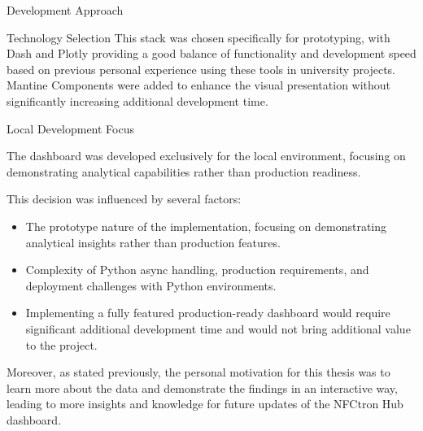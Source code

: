 \begin{section}{Development Approach}
\begin{subsection}{Technology Selection}
		This stack was chosen specifically for prototyping, with Dash and Plotly providing a good balance of functionality
		and development speed\cite{plotly_dash_plotly_com} based on previous personal experience using these tools in university projects.
		Mantine Components were added to enhance the visual presentation without significantly increasing additional development time.
	\end{subsection}

	\begin{subsection}{Local Development Focus}
		\label{subsec:implementation-development-approach-local}

		The dashboard was developed exclusively for the local environment, focusing on demonstrating analytical capabilities rather than production readiness.

		\pagebreak[4]

		This decision was influenced by several factors:
		\begin{itemize}
			\item The prototype nature of the implementation, focusing on demonstrating analytical insights rather than production features.
			\item Complexity of Python async handling, production requirements, and deployment challenges with Python environments.
			\item Implementing a fully featured production-ready dashboard would require significant additional development time and would not bring additional value to the project.
		\end{itemize}

		Moreover, as stated previously, the personal motivation for this thesis was to learn more about the data and demonstrate the findings in an interactive way, leading to more insights and knowledge for future updates of the NFCtron Hub dashboard.

	\end{subsection}
\end{section}

